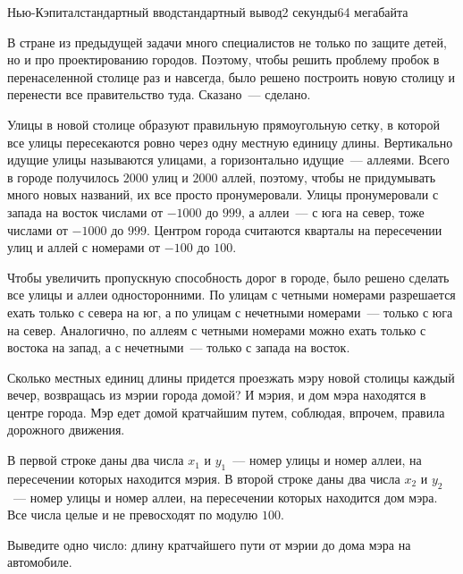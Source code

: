 \begin{problem}{Нью-Кэпитал}{стандартный ввод}{стандартный вывод}{2 секунды}{64 мегабайта}

В стране из предыдущей задачи много специалистов не только по защите детей, но и про проектированию городов. Поэтому, чтобы решить проблему пробок в перенаселенной столице раз и навсегда, было решено построить новую столицу и перенести все правительство туда. Сказано~--- сделано. 

Улицы в новой столице образуют правильную прямоугольную сетку, в которой все улицы пересекаются ровно через одну местную единицу длины. Вертикально идущие улицы называются улицами, а горизонтально идущие~--- аллеями. Всего в городе получилось $2000$ улиц и $2000$ аллей, поэтому, чтобы не придумывать много новых названий, их все просто пронумеровали. Улицы пронумеровали с запада на восток числами от $-1000$ до $999$, а аллеи~--- с юга на север, тоже числами от $-1000$ до $999$. Центром города считаются кварталы на пересечении улиц и аллей с номерами от $-100$ до $100$. 

Чтобы увеличить пропускную способность дорог в городе, было решено сделать все улицы и аллеи односторонними. По улицам с четными номерами разрешается ехать только с севера на юг, а по улицам с нечетными номерами~--- только с юга на север. Аналогично, по аллеям с четными номерами можно ехать только с востока на запад, а с нечетными~--- только с запада на восток. 

Сколько местных единиц длины придется проезжать мэру новой столицы каждый вечер, возвращась из мэрии города домой? И мэрия, и дом мэра находятся в центре города. Мэр едет домой кратчайшим путем, соблюдая, впрочем, правила дорожного движения.

\InputFile
В первой строке даны два числа $x_1$ и $y_1$~--- номер улицы и номер аллеи, на пересечении которых находится мэрия. В второй строке даны два числа $x_2$ и $y_2$~--- номер улицы и номер аллеи, на пересечении которых находится дом мэра. Все числа целые и не превосходят по модулю $100$. 

\OutputFile
Выведите одно число: длину кратчайшего пути от мэрии до дома мэра на автомобиле. 

\Examples

\begin{example}
%
%
\end{example}

\end{problem}
